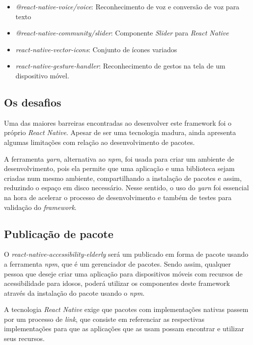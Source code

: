 \documentclass[
	12pt,				    %
	openright,			    %
	oneside,			    %
	a4paper,			    %
    sumario=tradicional,    %
	english,			    %
	brazil,				    %
	]{abntex2}              %
\begin{document}
\begin{itemize}
	\item \textit{@react-native-voice/voice}: Reconhecimento de voz e conversão de voz para texto
	\item \textit{@react-native-community/slider}: Componente \textit{Slider} para \textit{React Native}
	\item \textit{react-native-vector-icons}: Conjunto de ícones variados
	\item \textit{react-native-gesture-handler}: Reconhecimento de gestos na tela de um dispositivo móvel.
\end{itemize}

\subsection{Os desafios}

Uma das maiores barreiras encontradas ao desenvolver este framework foi o próprio \textit{React Native}. Apesar de ser uma tecnologia madura, ainda apresenta algumas limitações com relação ao desenvolvimento de pacotes.

\par

A ferramenta \textit{yarn}, alternativa ao \textit{npm}, foi usada para criar um ambiente de desenvolvimento, pois ela permite que uma aplicação e uma biblioteca sejam criadas num mesmo ambiente, compartilhando a instalação de pacotes e assim, reduzindo o espaço em disco necessário. Nesse sentido, o uso do \textit{yarn} foi essencial na hora de acelerar o processo de desenvolvimento e também de testes para validação do \textit{framework}.

\subsection{Publicação de pacote}

O \textit{react-native-accessibility-elderly} será um publicado em forma de pacote usando a ferramenta \textit{npm}, que é um gerenciador de pacotes. Sendo assim, qualquer pessoa que deseje criar uma aplicação para dispositivos móveis com recursos de acessibilidade para idosos, poderá utilizar os componentes deste framework através da instalação do pacote usando o \textit{npm}.

A tecnologia \textit{React Native} exige que pacotes com implementações nativas passem por um processo de \textit{link}, que consiste em referenciar as respectivas implementações para que as aplicações que as usam possam encontrar e utilizar seus recursos.
\end{document}

